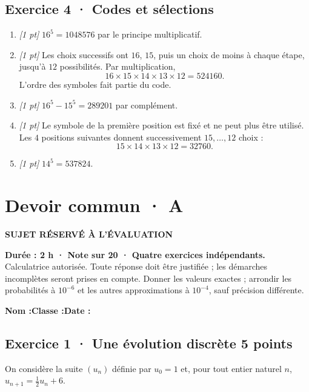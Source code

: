 \subsection*{Exercice 4 · Codes et sélections}\begin{enumerate}

\item \textit{[1 pt]} $16^5=1048576$ par le principe multiplicatif.

\item \textit{[1 pt]} Les choix successifs ont $16$, $15$, puis un choix de moins à chaque étape, jusqu'à $12$ possibilités. Par multiplication,
\[16\times15\times14\times13\times12=524160.\]
L'ordre des symboles fait partie du code.

\item \textit{[1 pt]} $16^5-15^5=289201$ par complément.

\item \textit{[1 pt]} Le symbole de la première position est fixé et ne peut plus être utilisé. Les $4$ positions suivantes donnent successivement $15,\ldots,12$ choix :
\[15\times14\times13\times12=32760.\]

\item \textit{[1 pt]} $14^5=537824$.

\end{enumerate}

\fi

\ifprof

\clearpage{}\label{sujet:3-3}

\section*{Devoir commun · A}

{\sffamily\bfseries\color{amber}SUJET RÉSERVÉ À L'ÉVALUATION\par}

\textbf{Durée : 2 h · Note sur 20 · Quatre exercices indépendants.}\\Calculatrice autorisée. Toute réponse doit être justifiée ; les démarches incomplètes seront prises en compte. Donner les valeurs exactes ; arrondir les probabilités à $10^{-6}$ et les autres approximations à $10^{-4}$, sauf précision différente.

\smallskip\textbf{Nom :}\enspace\dotfill\quad\textbf{Classe :}\enspace\dotfill\quad\textbf{Date :}\enspace\dotfill

\subsection*{Exercice 1 · Une évolution discrète \hfill 5 points}On considère la suite $(u_n)$ définie par $u_0=1$ et, pour tout entier naturel $n$, $u_{n+1}=\frac{1}{2}u_n+6$.

